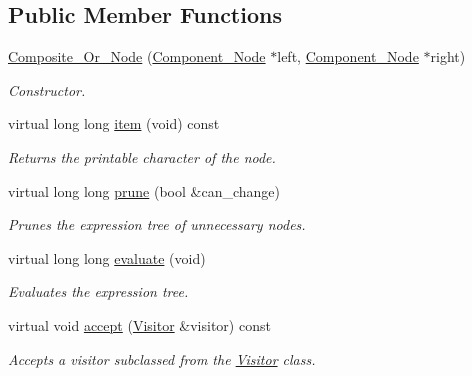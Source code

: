 \subsection*{Public Member Functions}
\begin{DoxyCompactItemize}
\item 
\hyperlink{classMadara_1_1Expression__Tree_1_1Composite__Or__Node_a208b1ef0f2bac8956f73721c2ec96291}{Composite\_\-Or\_\-Node} (\hyperlink{classMadara_1_1Expression__Tree_1_1Component__Node}{Component\_\-Node} $\ast$left, \hyperlink{classMadara_1_1Expression__Tree_1_1Component__Node}{Component\_\-Node} $\ast$right)
\begin{DoxyCompactList}\small\item\em Constructor. \item\end{DoxyCompactList}\item 
virtual long long \hyperlink{classMadara_1_1Expression__Tree_1_1Composite__Or__Node_a43e7b6917bb7b627598a84d69c1d1272}{item} (void) const 
\begin{DoxyCompactList}\small\item\em Returns the printable character of the node. \item\end{DoxyCompactList}\item 
virtual long long \hyperlink{classMadara_1_1Expression__Tree_1_1Composite__Or__Node_abd05fbf9e57faa6282c7fa0ed5efd219}{prune} (bool \&can\_\-change)
\begin{DoxyCompactList}\small\item\em Prunes the expression tree of unnecessary nodes. \item\end{DoxyCompactList}\item 
virtual long long \hyperlink{classMadara_1_1Expression__Tree_1_1Composite__Or__Node_a53f207a7bbba2e4d2baa342c8334fad2}{evaluate} (void)
\begin{DoxyCompactList}\small\item\em Evaluates the expression tree. \item\end{DoxyCompactList}\item 
virtual void \hyperlink{classMadara_1_1Expression__Tree_1_1Composite__Or__Node_a947941a0f7a13ddc13f03040c3734964}{accept} (\hyperlink{classMadara_1_1Expression__Tree_1_1Visitor}{Visitor} \&visitor) const 
\begin{DoxyCompactList}\small\item\em Accepts a visitor subclassed from the \hyperlink{classMadara_1_1Expression__Tree_1_1Visitor}{Visitor} class. \item\end{DoxyCompactList}\item 

\end{DoxyCompactItemize}
